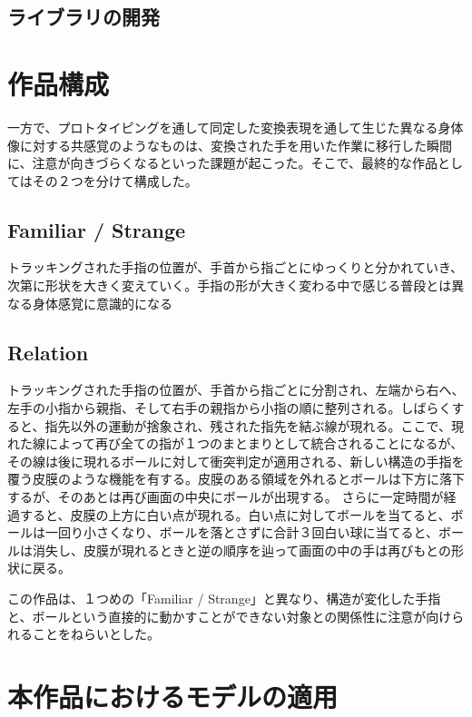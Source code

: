 \subsection{ライブラリの開発}
\section{作品構成}
一方で、プロトタイピングを通して同定した変換表現を通して生じた異なる身体像に対する共感覚のようなものは、変換された手を用いた作業に移行した瞬間に、注意が向きづらくなるといった課題が起こった。そこで、最終的な作品としてはその２つを分けて構成した。

\subsection{Familiar / Strange}
トラッキングされた手指の位置が、手首から指ごとにゆっくりと分かれていき、次第に形状を大きく変えていく。手指の形が大きく変わる中で感じる普段とは異なる身体感覚に意識的になる

\subsection{Relation}
トラッキングされた手指の位置が、手首から指ごとに分割され、左端から右へ、左手の小指から親指、そして右手の親指から小指の順に整列される。しばらくすると、指先以外の運動が捨象され、残された指先を結ぶ線が現れる。ここで、現れた線によって再び全ての指が１つのまとまりとして統合されることになるが、その線は後に現れるボールに対して衝突判定が適用される、新しい構造の手指を覆う皮膜のような機能を有する。皮膜のある領域を外れるとボールは下方に落下するが、そのあとは再び画面の中央にボールが出現する。
さらに一定時間が経過すると、皮膜の上方に白い点が現れる。白い点に対してボールを当てると、ボールは一回り小さくなり、ボールを落とさずに合計３回白い球に当てると、ボールは消失し、皮膜が現れるときと逆の順序を辿って画面の中の手は再びもとの形状に戻る。

この作品は、１つめの「Familiar / Strange」と異なり、構造が変化した手指と、ボールという直接的に動かすことができない対象との関係性に注意が向けられることをねらいとした。
\section{本作品におけるモデルの適用}
